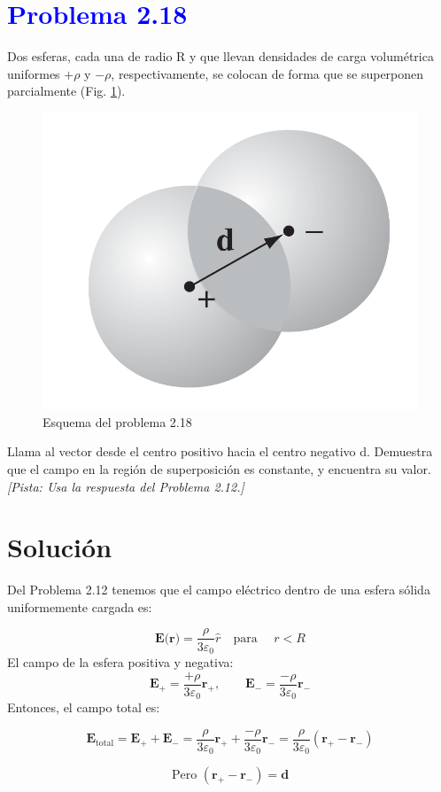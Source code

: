 \documentclass[12pt]{article}
\begin{document}
\section*{\textcolor{blue}{Problema 2.18}}
Dos esferas, cada una de radio R y que llevan densidades de carga volumétrica uniformes \(+ \rho\)  y \( -\rho\), respectivamente, se colocan de forma que se superponen parcialmente (Fig. \ref{fig:figura2.28}).

\begin{figure}[ht]
    \centering
    \includegraphics[width=0.4\linewidth]{imagenes/6_IMG.png}
    \caption{Esquema del problema 2.18}
    \label{fig:figura2.28}
\end{figure}

Llama al vector desde el centro positivo hacia el centro negativo d.
Demuestra que el campo en la región de superposición es constante, y encuentra su valor.
\textit{[Pista: Usa la respuesta del Problema 2.12.]}
\section*{Solución}
Del Problema 2.12 tenemos que el campo eléctrico dentro de una esfera sólida uniformemente cargada es:

\[
\textbf{E(r)}= \frac{\rho}{3 \varepsilon_0} \hat{r} \quad \text{para } \quad r < R
\]
El campo de la esfera positiva y negativa:
\[
\textbf{E}_+ = \frac{+\rho}{3 \varepsilon_0} \textbf{r}_+, \qquad
\textbf{E}_- = \frac{-\rho}{3 \varepsilon_0} \textbf{r}_-
\]
Entonces, el campo total es:

\[
\textbf{E}_{\text{total}} = \textbf{E}_+ + \textbf{E}_- 
= \frac{\rho}{3 \varepsilon_0} \textbf{r}_+ + \frac{-\rho}{3 \varepsilon_0} \textbf{r}_-
= \frac{\rho}{3 \varepsilon_0} (\textbf{r}_+ - \textbf{r}_-)
\]

\[
\text{Pero } (\textbf{r}_+ - \textbf{r}_-) = \textbf{d}
\]
\end{document}
